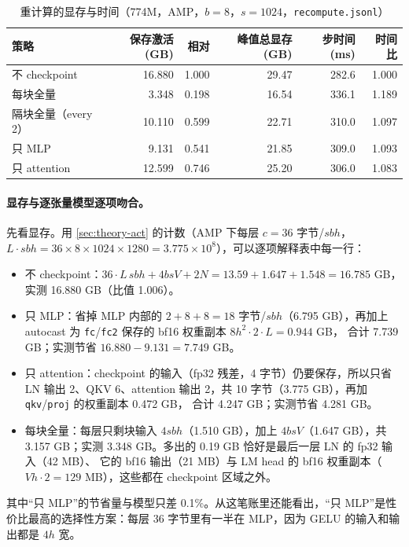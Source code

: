 \documentclass[11pt,a4paper]{ctexart}
\begin{document}
\begin{table}[H]\centering\small
\caption{重计算的显存与时间（774M，AMP，$b=8$，$s=1024$，\texttt{recompute.jsonl}）}
\label{tab:recompute}
\begin{tabular}{lrrrrr}
\toprule
策略 & 保存激活 (GB) & 相对 & 峰值总显存 (GB) & 步时间 (ms) & 时间比 \\
\midrule
不 checkpoint & 16.880 & 1.000 & 29.47 & 282.6 & 1.000 \\
每块全量 & 3.348 & 0.198 & 16.54 & 336.1 & 1.189 \\
隔块全量（every 2） & 10.110 & 0.599 & 22.71 & 310.0 & 1.097 \\
只 MLP & 9.131 & 0.541 & 21.85 & 309.0 & 1.093 \\
只 attention & 12.599 & 0.746 & 25.20 & 306.0 & 1.083 \\
\bottomrule
\end{tabular}
\end{table}

\paragraph{显存与逐张量模型逐项吻合。} 先看显存。用 \cref{sec:theory-act} 的计数（AMP 下每层 $c=36$ 字节/$sbh$，$L\cdot sbh = 36\times8\times1024\times1280 = 3.775\times10^8$），可以逐项解释表中每一行：
\begin{itemize}
\item 不 checkpoint：$36\cdot L\,sbh + 4bsV + 2N = 13.59 + 1.647 + 1.548 = 16.785$ GB，实测 16.880 GB（比值 1.006）。
\item 只 MLP：省掉 MLP 内部的 $2+8+8=18$ 字节/$sbh$（6.795 GB），再加上 autocast 为 \texttt{fc}/\texttt{fc2} 保存的 bf16 权重副本 $8h^2\cdot2\cdot L = 0.944$ GB，
合计 7.739 GB；实测节省 $16.880-9.131=7.749$ GB。
\item 只 attention：checkpoint 的输入（fp32 残差，4 字节）仍要保存，所以只省 LN 输出 2、QKV 6、attention 输出 2，共 10 字节（3.775 GB），再加 \texttt{qkv}/\texttt{proj} 的权重副本 0.472 GB，
合计 4.247 GB；实测节省 4.281 GB。
\item 每块全量：每层只剩块输入 $4sbh$（1.510 GB），加上 $4bsV$（1.647 GB），共 3.157 GB；实测 3.348 GB。多出的 0.19 GB 恰好是最后一层 LN 的 fp32 输入（42 MB）、
它的 bf16 输出（21 MB）与 LM head 的 bf16 权重副本（$Vh\cdot2=129$ MB），这些都在 checkpoint 区域之外。
\end{itemize}
其中“只 MLP”的节省量与模型只差 0.1\%。从这笔账里还能看出，“只 MLP”是性价比最高的选择性方案：每层 36 字节里有一半在 MLP，因为 GELU 的输入和输出都是 $4h$ 宽。
\end{document}
